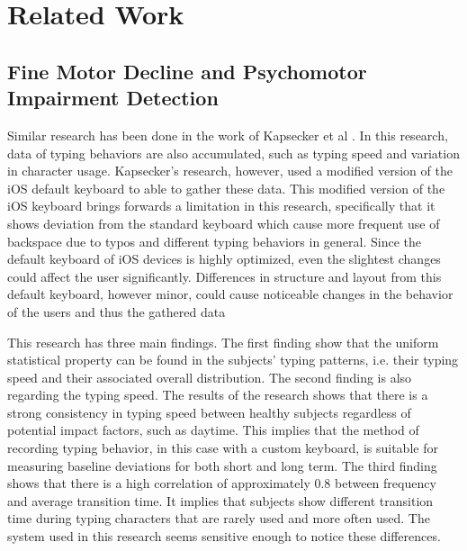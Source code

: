 \chapter{Related Work}


\section{Fine Motor Decline and Psychomotor Impairment Detection}

Similar research has been done in the work of Kapsecker et al \cite{kapsecker2022}. 
In this research, data of typing behaviors are also accumulated, such as typing speed and variation in character usage. 
Kapsecker's research, however, used a modified version of the iOS default keyboard to able to gather these data. 
This modified version of the iOS keyboard brings forwards a limitation in this research, specifically that it shows deviation from the standard keyboard which cause more frequent use of backspace due to typos and different typing behaviors in general.
Since the default keyboard of iOS devices is highly optimized, even the slightest changes could affect the user significantly. 
Differences in structure and layout from this default keyboard, however minor, could cause noticeable changes in the behavior of the users and thus the gathered data

This research has three main findings. 
The first finding show that the uniform statistical property can be found in the subjects' typing patterns, i.e. their typing speed and their associated overall distribution. 
The second finding is also regarding the typing speed. 
The results of the research shows that there is a strong consistency in typing speed between healthy subjects regardless of potential impact factors, such as daytime. 
This implies that the method of recording typing behavior, in this case with a custom keyboard, is suitable for measuring baseline deviations for both short and long term. 
The third finding shows that there is a high correlation of approximately 0.8 between frequency and average transition time. 
It implies that subjects show different transition time during typing characters that are rarely used and more often used. 
The system used in this research seems sensitive enough to notice these differences.

